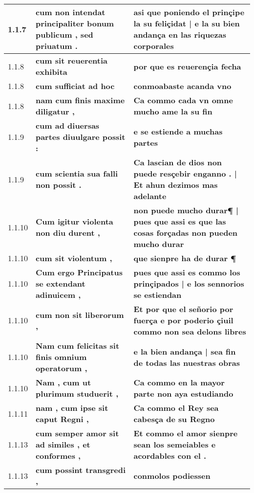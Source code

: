 \begin{tabular}{|p{1cm}|p{6.5cm}|p{6.5cm}|}
1.1.7 &  \textbf{ cum non intendat principaliter bonum publicum , sed priuatum . }  &  \textbf{ asi que poniendo el prinçipe la su feliçidat | e la su bien andança en las riquezas corporales }  \\\hline
1.1.8 &  \textbf{ cum sit reuerentia exhibita }  &  \textbf{ por que es reuerençia fecha }  \\\hline
1.1.8 &  \textbf{ cum sufficiat ad hoc }  &  \textbf{ conmoabaste acanda vno }  \\\hline
1.1.8 &  \textbf{ nam cum finis maxime diligatur , }  &  \textbf{ Ca commo cada vn omne mucho ame la su fin }  \\\hline
1.1.9 &  \textbf{ cum ad diuersas partes diuulgare possit : }  &  \textbf{ e se estiende a muchas partes }  \\\hline
1.1.9 &  \textbf{ cum scientia sua falli non possit . }  &  \textbf{ Ca lascian de dios non puede resçebir enganno . | Et ahun dezimos mas adelante }  \\\hline
1.1.10 &  \textbf{ Cum igitur violenta non diu durent , }  &  \textbf{ non puede mucho durar¶ | pues que assi es que las cosas forçadas non pueden mucho durar }  \\\hline
1.1.10 &  \textbf{ cum sit violentum , }  &  \textbf{ que sienpre ha de durar ¶ }  \\\hline
1.1.10 &  \textbf{ Cum ergo Principatus se extendant adinuicem , }  &  \textbf{ pues que assi es commo los prinçipados | e los sennorios se estiendan }  \\\hline
1.1.10 &  \textbf{ cum non sit liberorum , }  &  \textbf{ Et por que el señorio por fuerça e por poderio çiuil commo non sea delons libres }  \\\hline
1.1.10 &  \textbf{ Nam cum felicitas sit finis omnium operatorum , }  &  \textbf{ e la bien andança | sea fin de todas las nuestras obras }  \\\hline
1.1.10 &  \textbf{ Nam , cum ut plurimum studuerit , }  &  \textbf{ Ca commo en la mayor parte non aya estudiando }  \\\hline
1.1.11 &  \textbf{ nam , cum ipse sit caput Regni , }  &  \textbf{ Ca commo el Rey sea cabesça de su Regno }  \\\hline
1.1.13 &  \textbf{ cum semper amor sit ad similes , et conformes , }  &  \textbf{ Et commo el amor sienpre sean los semeiables e acordables con el . }  \\\hline
1.1.13 &  \textbf{ cum possint transgredi , }  &  \textbf{ conmolos podiessen }  \\\hline

\end{tabular}
